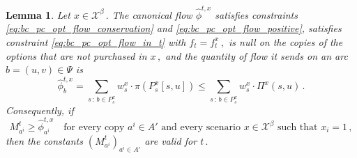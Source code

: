 \documentclass[11pt,a4paper]{report}
\newtheorem{lemma}[theorem]{Lemma}
\theoremstyle{definition}
\theoremstyle{remark}
\begin{document}
\begin{lemma}\label{lemma:big_m_sufficient_condition}
  Let $x \in \mathcal{X}^\beta\,.$ The canonical flow $\hat{\phi}^{t,x}$ satisfies constraints \eqref{eq:bc_pc_opt_flow_conservation} and \eqref{eq:bc_pc_opt_flow_positive}, satisfies constraint \eqref{eq:bc_pc_opt_flow_in_t} with $f_t = f^x_t\,,$ is null on the copies of the options that are not purchased in $x\,,$ and the quantity of flow it sends on an arc $b=(u,v) \in \Psi$ is
  \begin{equation}\label{eq:big_m_canonical_flow}
    \hat{\phi}^{t,x}_b = \sum_{s \,:\, b \in P^x_s} w^x_s \cdot \pi\left(P^x_s[s,u]\right) \leq \sum_{s \,:\, b \in P^x_s} w^x_s \cdot \Pi^x(s,u)\,.
  \end{equation}
  Consequently, if
  \begin{equation*}\label{eq:big_m_V}
    M^t_{a^i} \geq \hat{\phi}^{t,x}_{a^i} \quad \text{for every copy $a^i \in A'$ and every scenario $x \in \mathcal{X}^\beta$ such that $x_i = 1$}\,,
    \tag{V}
  \end{equation*}
  then the constants $(M^t_{a^i})_{a^i \in A'}$ are valid for $t\,.$
\end{lemma}
\end{document}
